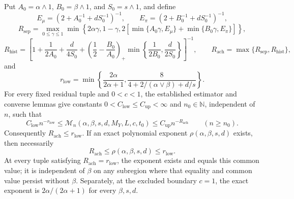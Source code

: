 Put \(A_0=\alpha\wedge1\), \(B_0=\beta\wedge1\), and \(S_0=s\wedge1\), and define
\[
E_\mu=\left(2+A_0^{-1}+dS_0^{-1}\right)^{-1},\qquad E_\pi=\left(2+B_0^{-1}+dS_0^{-1}\right)^{-1},
\]
\[
R_{\mathrm{sep}}=\max_{0\le\gamma\le1}\min\left\{2\alpha\gamma,1-\gamma,2\left[\min\{A_0\gamma,E_\mu\}+\min\{B_0\gamma,E_\pi\}\right]\right\},
\]
\[
R_{\mathrm{hist}}=\left[1+\frac1{2A_0}+\frac d{4S_0}+\left(\frac12-\frac{B_0}{A_0}\right)_+\min\left\{\frac1{2B_0},\frac d{2S_0}\right\}\right]^{-1},\qquad R_{\mathrm{ach}}=\max\{R_{\mathrm{sep}},R_{\mathrm{hist}}\},
\]
and
\[
r_{\mathrm{low}}=\min\left\{\frac{2\alpha}{2\alpha+1},\frac8{4+2/(\alpha\vee\beta)+d/s}\right\}.
\]
For every fixed residual tuple and \(0<c<1\), the established estimator and converse lemmas give constants \(0<C_{\mathrm{low}}\le C_{\mathrm{up}}<\infty\) and \(n_0\in\mathbb N\), independent of \(n\), such that
\[
C_{\mathrm{low}}n^{-r_{\mathrm{low}}}\le\mathcal M_n(\alpha,\beta,s,d,M_Y,L,c,t_0)\le C_{\mathrm{up}}n^{-R_{\mathrm{ach}}}\qquad(n\ge n_0).
\]
Consequently \(R_{\mathrm{ach}}\le r_{\mathrm{low}}\). If an exact polynomial exponent \(\rho(\alpha,\beta,s,d)\) exists, then necessarily
\[
R_{\mathrm{ach}}\le\rho(\alpha,\beta,s,d)\le r_{\mathrm{low}}.
\]
At every tuple satisfying \(R_{\mathrm{ach}}=r_{\mathrm{low}}\), the exponent exists and equals this common value; it is independent of \(\beta\) on any subregion where that equality and common value persist without \(\beta\). Separately, at the excluded boundary \(c=1\), the exact exponent is \(2\alpha/(2\alpha+1)\) for every \(\beta,s,d\).